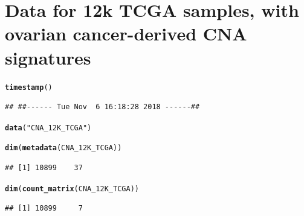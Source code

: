 \documentclass{article}\usepackage[]{graphicx}\usepackage[]{color}
\makeatletter
\newcommand{\hlstr}[1]{\textcolor[rgb]{0.192,0.494,0.8}{#1}}%
\newcommand{\hlstd}[1]{\textcolor[rgb]{0.345,0.345,0.345}{#1}}%
\newcommand{\hlkwd}[1]{\textcolor[rgb]{0.737,0.353,0.396}{\textbf{#1}}}%
\newenvironment{kframe}{%
 \def\at@end@of@kframe{}%
 \ifinner\ifhmode%
  \def\at@end@of@kframe{\end{minipage}}%
  \begin{minipage}{\columnwidth}%
 \fi\fi%
 \def\FrameCommand##1{\hskip\@totalleftmargin \hskip-\fboxsep
 \colorbox{shadecolor}{##1}\hskip-\fboxsep
     \hskip-\linewidth \hskip-\@totalleftmargin \hskip\columnwidth}%
 \MakeFramed {\advance\hsize-\width
   \@totalleftmargin\z@ \linewidth\hsize
   \@setminipage}}%
 {\par\unskip\endMakeFramed%
 \at@end@of@kframe}
\newenvironment{knitrout}{}{} %
\makeatother
\begin{document}
\section{Data for 12k TCGA samples, with ovarian cancer-derived CNA signatures}

\begin{knitrout}
\color{fgcolor}\begin{kframe}
\begin{alltt}
\hlkwd{timestamp}\hlstd{()}
\end{alltt}
\begin{verbatim}
## ##------ Tue Nov  6 16:18:28 2018 ------##
\end{verbatim}
\begin{alltt}
\hlkwd{data}\hlstd{(}\hlstr{"CNA_12K_TCGA"}\hlstd{)}

\hlkwd{dim}\hlstd{(}\hlkwd{metadata}\hlstd{(CNA_12K_TCGA))}
\end{alltt}
\begin{verbatim}
## [1] 10899    37
\end{verbatim}
\begin{alltt}
\hlkwd{dim}\hlstd{(}\hlkwd{count_matrix}\hlstd{(CNA_12K_TCGA))}
\end{alltt}
\begin{verbatim}
## [1] 10899     7
\end{verbatim}
\end{kframe}
\end{knitrout}
\end{document}
